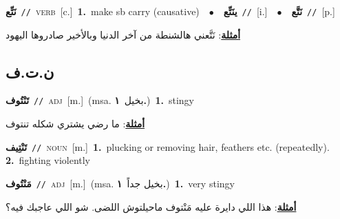 \documentclass[10pt,a4paper,twoside]{article} %
\begin{document}
\begin{multicols}{2}
{{{{{{{{{{{{\setlength\topsep{0pt}\textbf{\foreignlanguage{arabic}{نَتِّع}}\ {\color{gray}\texttt{//}\color{black}}\ \textsc{verb}\ [c.]\ \textbf{1.}~make sb carry (causative)\ \ $\bullet$\ \ \setlength\topsep{0pt}\textbf{\foreignlanguage{arabic}{ينَتِّع}}\ {\color{gray}\texttt{//}\color{black}}\ [i.]\ \ $\bullet$\ \ \setlength\topsep{0pt}\textbf{\foreignlanguage{arabic}{نَتَّع}}\ {\color{gray}\texttt{//}\color{black}}\ [p.]\  \begin{flushright}\color{gray}\foreignlanguage{arabic}{\textbf{\underline{\foreignlanguage{arabic}{أمثلة}}}: نَتَّعني هالشنطة من آخر الدنيا وبالأخير صادروها اليهود}\end{flushright}\color{black}} \vspace{2mm}

\vspace{-3mm}
\subsection*{\color{blue}\foreignlanguage{arabic}{ن.ت.ف}\color{blue}{}} 

{\setlength\topsep{0pt}\textbf{\foreignlanguage{arabic}{تَنْتُوف}}\ {\color{gray}\texttt{//}\color{black}}\ \textsc{adj}\ [m.]\ \color{gray}(msa. \foreignlanguage{arabic}{بخيل}~\foreignlanguage{arabic}{\textbf{١.}})\color{black}\ \textbf{1.}~stingy\  \begin{flushright}\color{gray}\foreignlanguage{arabic}{\textbf{\underline{\foreignlanguage{arabic}{أمثلة}}}: ما رضي يشتري شكله تنتوف}\end{flushright}\color{black}} \vspace{2mm}

{\setlength\topsep{0pt}\textbf{\foreignlanguage{arabic}{تَنْتِيف}}\ {\color{gray}\texttt{//}\color{black}}\ \textsc{noun}\ [m.]\ \textbf{1.}~plucking or removing hair, feathers etc. (repeatedly).  \textbf{2.}~fighting violently\ 

{\setlength\topsep{0pt}\textbf{\foreignlanguage{arabic}{مَنْتُوف}}\ {\color{gray}\texttt{//}\color{black}}\ \textsc{adj}\ [m.]\ \color{gray}(msa. \foreignlanguage{arabic}{بخيل جداً}~\foreignlanguage{arabic}{\textbf{١.}})\color{black}\ \textbf{1.}~very stingy\  \begin{flushright}\color{gray}\foreignlanguage{arabic}{\textbf{\underline{\foreignlanguage{arabic}{أمثلة}}}: هذا اللي دايرة عليه مَنْتوف ماحيلتوش اللضى. شو اللي عاجبك فيه؟}\end{flushright}\color{black}} \vspace{2mm}

}}}}}}}}}}}}
\end{multicols}
\end{document}
